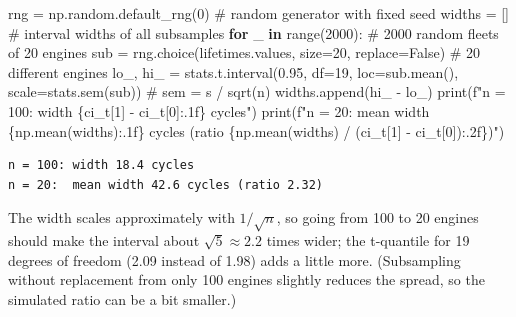 \documentclass[
  letterpaper,
  DIV=11,
  numbers=noendperiod]{scrreprt}
\newenvironment{Shaded}{\begin{snugshade}}{\end{snugshade}}
\newcommand{\BuiltInTok}[1]{\textcolor[rgb]{0.00,0.23,0.31}{#1}}
\newcommand{\CommentTok}[1]{\textcolor[rgb]{0.37,0.37,0.37}{#1}}
\newcommand{\ControlFlowTok}[1]{\textcolor[rgb]{0.00,0.23,0.31}{\textbf{#1}}}
\newcommand{\DecValTok}[1]{\textcolor[rgb]{0.68,0.00,0.00}{#1}}
\newcommand{\FloatTok}[1]{\textcolor[rgb]{0.68,0.00,0.00}{#1}}
\newcommand{\KeywordTok}[1]{\textcolor[rgb]{0.00,0.23,0.31}{\textbf{#1}}}
\newcommand{\NormalTok}[1]{\textcolor[rgb]{0.00,0.23,0.31}{#1}}
\newcommand{\OperatorTok}[1]{\textcolor[rgb]{0.37,0.37,0.37}{#1}}
\newcommand{\SpecialCharTok}[1]{\textcolor[rgb]{0.37,0.37,0.37}{#1}}
\newcommand{\SpecialStringTok}[1]{\textcolor[rgb]{0.13,0.47,0.30}{#1}}
\newcommand{\VariableTok}[1]{\textcolor[rgb]{0.07,0.07,0.07}{#1}}
\begin{document}
\begin{tcolorbox}[enhanced jigsaw, left=2mm, title=\textcolor{quarto-callout-caution-color}{\faFire}\hspace{0.5em}{Solution to Exercise 3}, opacityback=0, breakable, rightrule=.15mm, arc=.35mm, toptitle=1mm, colbacktitle=quarto-callout-caution-color!10!white, opacitybacktitle=0.6, coltitle=black, colframe=quarto-callout-caution-color-frame, bottomrule=.15mm, leftrule=.75mm, bottomtitle=1mm, titlerule=0mm, toprule=.15mm, colback=white]

\begin{Shaded}
\begin{Highlighting}[]
\NormalTok{rng }\OperatorTok{=}\NormalTok{ np.random.default\_rng(}\DecValTok{0}\NormalTok{)                      }\CommentTok{\# random generator with fixed seed}
\NormalTok{widths }\OperatorTok{=}\NormalTok{ []                                         }\CommentTok{\# interval widths of all subsamples}
\ControlFlowTok{for}\NormalTok{ \_ }\KeywordTok{in} \BuiltInTok{range}\NormalTok{(}\DecValTok{2000}\NormalTok{):                               }\CommentTok{\# 2000 random fleets of 20 engines}
\NormalTok{    sub }\OperatorTok{=}\NormalTok{ rng.choice(lifetimes.values, size}\OperatorTok{=}\DecValTok{20}\NormalTok{, replace}\OperatorTok{=}\VariableTok{False}\NormalTok{)   }\CommentTok{\# 20 different engines}
\NormalTok{    lo\_, hi\_ }\OperatorTok{=}\NormalTok{ stats.t.interval(}\FloatTok{0.95}\NormalTok{, df}\OperatorTok{=}\DecValTok{19}\NormalTok{, loc}\OperatorTok{=}\NormalTok{sub.mean(), scale}\OperatorTok{=}\NormalTok{stats.sem(sub))  }\CommentTok{\# sem = s / sqrt(n)}
\NormalTok{    widths.append(hi\_ }\OperatorTok{{-}}\NormalTok{ lo\_)}
\BuiltInTok{print}\NormalTok{(}\SpecialStringTok{f"n = 100: width }\SpecialCharTok{\{}\NormalTok{ci\_t[}\DecValTok{1}\NormalTok{] }\OperatorTok{{-}}\NormalTok{ ci\_t[}\DecValTok{0}\NormalTok{]}\SpecialCharTok{:.1f\}}\SpecialStringTok{ cycles"}\NormalTok{)}
\BuiltInTok{print}\NormalTok{(}\SpecialStringTok{f"n = 20:  mean width }\SpecialCharTok{\{}\NormalTok{np}\SpecialCharTok{.}\NormalTok{mean(widths)}\SpecialCharTok{:.1f\}}\SpecialStringTok{ cycles (ratio }\SpecialCharTok{\{}\NormalTok{np}\SpecialCharTok{.}\NormalTok{mean(widths) }\OperatorTok{/}\NormalTok{ (ci\_t[}\DecValTok{1}\NormalTok{] }\OperatorTok{{-}}\NormalTok{ ci\_t[}\DecValTok{0}\NormalTok{])}\SpecialCharTok{:.2f\}}\SpecialStringTok{)"}\NormalTok{)}
\end{Highlighting}
\end{Shaded}

\begin{verbatim}
n = 100: width 18.4 cycles
n = 20:  mean width 42.6 cycles (ratio 2.32)
\end{verbatim}

The width scales approximately with \(1/\sqrt{n}\), so going from 100 to
20 engines should make the interval about \(\sqrt{5} \approx 2.2\) times
wider; the t-quantile for 19 degrees of freedom (2.09 instead of 1.98)
adds a little more. (Subsampling without replacement from only 100
engines slightly reduces the spread, so the simulated ratio can be a bit
smaller.)

\end{tcolorbox}
\end{document}
